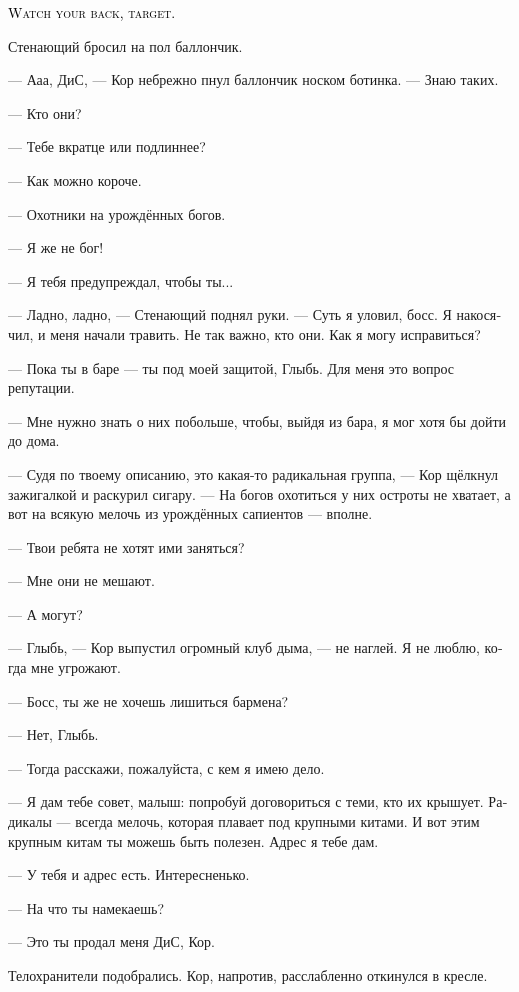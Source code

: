\documentclass[a4paper,12pt,fleqn]{book}\usepackage{cooltooltips}\usepackage{polyglossia}\setdefaultlanguage[babelshorthands=true]{russian}\setotherlanguage{english}\defaultfontfeatures{Ligatures=TeX,Mapping=tex-text} \usepackage{xcolor}\definecolor{lightgray}{HTML}{bbbbbb}\color{lightgray}\newcommand{\ml}[3]{\textenglish{\textcolor{black}{#3}}}
\newcommand{\asterism}{\vspace{1em}{\centering\Large\bfseries$\ast~\ast~\ast$\par}\vspace{1em}}
\begin{document}
\ml{$0$}
{<<Оглядывайся, цель>>.}
{\textsc{Watch your back, target.}}


\asterism

Стенающий бросил на пол баллончик.

--- Ааа, ДиС, --- Кор небрежно пнул баллончик носком ботинка.
--- Знаю таких.

--- Кто они?

--- Тебе вкратце или подлиннее?

--- Как можно короче.

--- Охотники на урождённых богов.

--- Я же не бог!

--- Я тебя предупреждал, чтобы ты...

--- Ладно, ладно, --- Стенающий поднял руки.
--- Суть я уловил, босс.
Я накосячил, и меня начали травить.
Не так важно, кто они.
Как я могу исправиться?

--- Пока ты в баре --- ты под моей защитой, Глыбь.
Для меня это вопрос репутации.

--- Мне нужно знать о них побольше, чтобы, выйдя из бара, я мог хотя бы дойти до дома.

--- Судя по твоему описанию, это какая-то радикальная группа, --- Кор щёлкнул зажигалкой и раскурил сигару.
--- На богов охотиться у них остроты не хватает, а вот на всякую мелочь из урождённых сапиентов --- вполне.

--- Твои ребята не хотят ими заняться?

--- Мне они не мешают.

--- А могут?

--- Глыбь, --- Кор выпустил огромный клуб дыма, --- не наглей.
Я не люблю, когда мне угрожают.

--- Босс, ты же не хочешь лишиться бармена?

--- Нет, Глыбь.

--- Тогда расскажи, пожалуйста, с кем я имею дело.

--- Я дам тебе совет, малыш: попробуй договориться с теми, кто их крышует.
Радикалы --- всегда мелочь, которая плавает под крупными китами.
И вот этим крупным китам ты можешь быть полезен.
Адрес я тебе дам.

--- У тебя и адрес есть.
Интересненько.

--- На что ты намекаешь?

--- Это ты продал меня ДиС, Кор.

Телохранители подобрались.
Кор, напротив, расслабленно откинулся в кресле.
\end{document}
